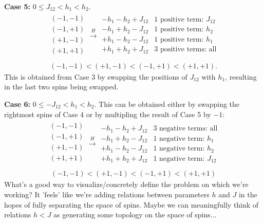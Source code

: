 \textbf{Case 5:} $0 \leq J_{12} < h_1 < h_2$.
\begin{align*}
	\begin{array}{c}
		(-1,-1) \\
		(-1,+1) \\
		(+1,-1) \\
		(+1,+1) \\
	\end{array} \xrightarrow{H}
	\begin{array}{c|c}
		-h_1-h_2+J_{12} & \text{1 positive term: } J_{12}\\
		-h_1+h_2-J_{12} & \text{1 positive term: } h_2\\
		+h_1-h_2-J_{12} & \text{1 positive term: } h_1\\
		\hline
		+h_1+h_2+J_{12} & \text{3 positive terms: all} \\
	\end{array}
\end{align*}
\begin{align*}
	(-1,-1) < (+1,-1) < (-1,+1) < (+1,+1).
\end{align*}
This is obtained from Case 3 by swapping the positions of $J_{12}$ with $h_1$, resulting in the last two spins being swapped.

\textbf{Case 6:} $0 \leq -J_{12} < h_1 < h_2$. This can be obtained either by swapping the rightmost spins of Case 4 or by multipling the result of Case 5 by $-1$:
\begin{align*}
	\begin{array}{c}
		(-1,-1) \\
		(-1,+1) \\
		(+1,-1) \\
		(+1,+1) \\
	\end{array} \xrightarrow{H}
	\begin{array}{c|c}
		-h_1-h_2+J_{12} & \text{3 negative terms: all}\\
		-h_1+h_2-J_{12} & \text{1 negative term: } h_1\\
		+h_1-h_2-J_{12} & \text{1 negative term: } h_2\\
		\hline
		+h_1+h_2+J_{12} & \text{1 negative term: } J_{12}
	\end{array}
\end{align*}
\begin{align*}
	(-1,-1) < (+1,-1) < (-1,+1) < (+1,+1)
\end{align*}
\newpage
{}
What's a good way to visualize/concretely define the problem on which we're working? It 'feels' like we're adding relations between parameters $h$ and $J$ in the hopes of fully separating the space of spins. Maybe we can meaningfully think of relations $h < J$ as generating some topology on the space of spins...

